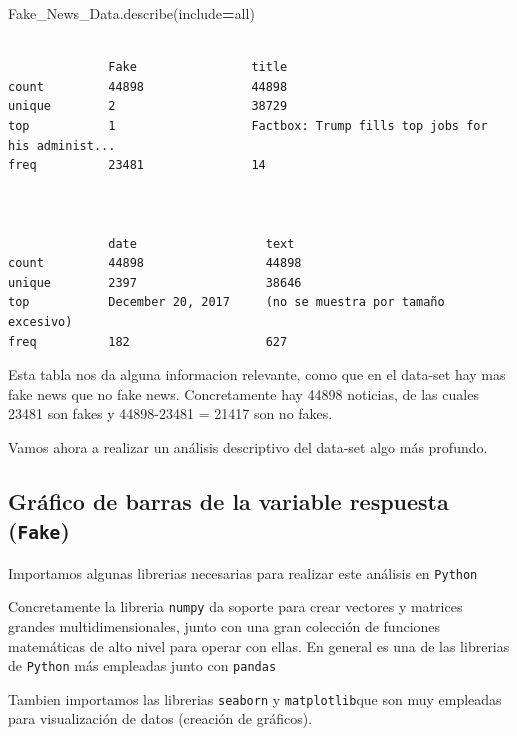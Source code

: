 \documentclass[
  11pt,
  a4paper,
]{article}
\newenvironment{Shaded}{\begin{snugshade}}{\end{snugshade}}
\newcommand{\NormalTok}[1]{#1}
\newcommand{\OperatorTok}[1]{\textcolor[rgb]{0.81,0.36,0.00}{\textbf{#1}}}
\newcommand{\StringTok}[1]{\textcolor[rgb]{0.31,0.60,0.02}{#1}}
\begin{document}
\begin{Shaded}
\begin{Highlighting}[]
\NormalTok{Fake\_News\_Data.describe(include}\OperatorTok{=}\StringTok{\textquotesingle{}all\textquotesingle{}}\NormalTok{)}
\end{Highlighting}
\end{Shaded}

\begin{verbatim}

              Fake                title       
count         44898               44898        
unique        2                   38729        
top           1                   Factbox: Trump fills top jobs for his administ...          
freq          23481               14         



              date                  text 
count         44898                 44898
unique        2397                  38646
top           December 20, 2017     (no se muestra por tamaño excesivo)
freq          182                   627
\end{verbatim}

Esta tabla nos da alguna informacion relevante, como que en el data-set
hay mas fake news que no fake news. Concretamente hay 44898 noticias, de
las cuales 23481 son fakes y 44898-23481 = 21417 son no fakes.

Vamos ahora a realizar un análisis descriptivo del data-set algo más
profundo.

\hypertarget{gruxe1fico-de-barras-de-la-variable-respuesta-fake}{%
\subsection{\texorpdfstring{Gráfico de barras de la variable respuesta
(\texttt{Fake})}{Gráfico de barras de la variable respuesta (Fake)}}\label{gruxe1fico-de-barras-de-la-variable-respuesta-fake}}

Importamos algunas librerias necesarias para realizar este análisis en
\texttt{Python}

Concretamente la libreria \texttt{numpy} da soporte para crear vectores
y matrices grandes multidimensionales, junto con una gran colección de
funciones matemáticas de alto nivel para operar con ellas. En general es
una de las librerias de \texttt{Python} más empleadas junto con
\texttt{pandas}

Tambien importamos las librerias \texttt{seaborn} y
\texttt{matplotlib}que son muy empleadas para visualización de datos
(creación de gráficos).
\end{document}
